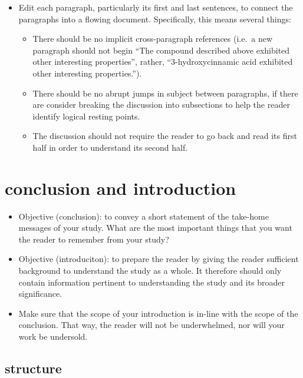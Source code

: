 \documentclass[
]{krantz}
\providecommand{\tightlist}{%
  \setlength{\itemsep}{0pt}\setlength{\parskip}{0pt}}
\begin{document}
\begin{itemize}
\tightlist
\item
  Edit each paragraph, particularly its first and last sentences, to connect the paragraphs into a flowing document. Specifically, this means several things:

  \begin{itemize}
  \tightlist
  \item
    There should be no implicit cross-paragraph references (i.e.~a new paragraph should not begin ``The compound described above exhibited other interesting properties'', rather, ``3-hydroxycinnamic acid exhibited other interesting properties.'').
  \item
    There should be no abrupt jumps in subject between paragraphs, if there are consider breaking the discussion into subsections to help the reader identify logical resting points.
  \item
    The discussion should not require the reader to go back and read its first half in order to understand its second half.
  \end{itemize}
\end{itemize}

\hypertarget{conclusion-and-introduction}{%
\section{conclusion and introduction}\label{conclusion-and-introduction}}

\begin{itemize}
\item
  Objective (conclusion): to convey a short statement of the take-home messages of your study. What are the most important things that you want the reader to remember from your study?
\item
  Objective (introduciton): to prepare the reader by giving the reader sufficient background to understand the study as a whole. It therefore should only contain information pertinent to understanding the study and its broader significance.
\item
  Make sure that the scope of your introduction is in-line with the scope of the conclusion. That way, the reader will not be underwhelmed, nor will your work be undersold.
\end{itemize}

\hypertarget{structure-1}{%
\subsection{structure}\label{structure-1}}
\end{document}
